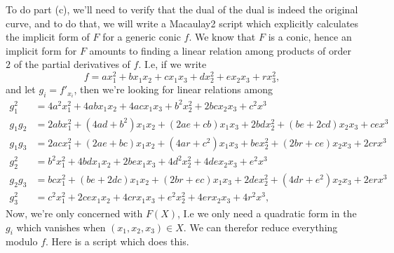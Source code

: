 \documentclass{article}
\theoremstyle{definition}
\begin{document}
To do part (c), we'll need to verify that the dual of the dual is indeed the
original curve, and to do that, we will write a Macaulay2 script which
explicitly calculates the implicit form of $F$ for a generic conic $f$. We know
that $F$ is a conic, hence an implicit form for $F$ amounts to finding a linear
relation among products of order $2$ of the partial derivatives of $f$. I.e, if
we write 
\[
	f 
	= 
	a x_1^{2} + b x_1x_2 + c x_1x_3 + d x_2^2 + e x_2x_3 + r x_3^2,
\] 
and let $g_i = f'_{x_i}$, then we're looking for linear relations among 
\begin{align*}
	g_1^{2} &= 
	4a^2 x_1^2 + 4ab x_1 x_2 + 4ac x_1 x_3 + b^2 x_2^2 + 2bc x_2x_3 + c^2 x^3 \\
	g_1g_2 &= 
	2ab x_1^2 + (4ad + b^2) x_1 x_2 + (2ae + cb) x_1 x_3 + 2bd x_2^2 + (be + 2cd) x_2x_3 + ce x^3 \\
	g_1g_3 &= 
	2ac x_1^2 + (2ae + bc) x_1 x_2 + (4ar + c^2) x_1 x_3 + be x_2^2 + (2br + ce) x_2x_3 + 2cr x^3 \\
	g_2^{2} &= 
	b^2 x_1^2 + 4bd x_1 x_2 + 2be x_1 x_3 + 4 d^2 x_2^2 + 4de x_2x_3 + e^2 x^3 \\
	g_2g_3 &= 
	bc x_1^2 + (be + 2dc) x_1 x_2 + (2br + ec) x_1 x_3 + 2de x_2^2 + (4dr + e^2) x_2x_3 + 2er x^3 \\
	g_3^{2} &= 
	c^2 x_1^2 + 2ce x_1 x_2 + 4cr x_1 x_3 + e^2 x_2^2 + 4er x_2x_3 + 4r^2 x^3,
\end{align*}
Now, we're only concerned with $F(X)$, I.e we only need a quadratic form in the
$g_i$ which vanishes when $(x_1,x_2,x_3) \in X$. We can therefor reduce
everything modulo $f$. Here is a script which does this.
\end{document}
